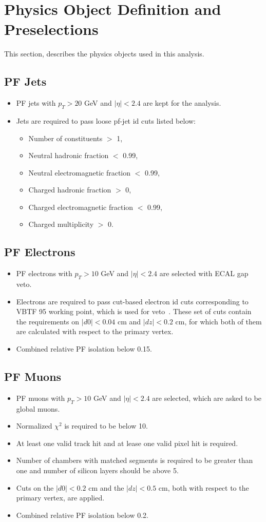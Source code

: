 \section{Physics Object Definition and Preselections}
\label{sect:objdef}
This section, describes the physics objects used in this analysis. 
\subsection{PF Jets}
\begin{itemize}
\item PF jets with $p_T>20$ GeV and $|\eta|<2.4$ are kept for the analysis.
\item Jets are required to pass loose pf-jet id cuts listed below:
\begin{itemize}
\item Number of constituents $>$ 1,
\item Neutral hadronic fraction $<$ 0.99,
\item Neutral electromagnetic fraction $<$ 0.99,
\item Charged hadronic fraction $>$ 0,
\item Charged electromagnetic fraction $<$ 0.99,
\item Charged multiplicity $>$ 0.
\end{itemize}
\end{itemize}
\subsection{PF Electrons}
\begin{itemize}
\item PF electrons with $p_T>10$ GeV and $|\eta|<2.4$ are selected with ECAL gap veto.
\item Electrons are required to pass cut-based electron id cuts corresponding to VBTF 95 working point, which is used for veto~\cite{eIDs}. These set of cuts contain the requirements on $|d0|<0.04$ cm and $|dz|<0.2$ cm, for which both of them are calculated with respect to the primary vertex. 
\item Combined relative PF isolation below 0.15.
\end{itemize}
\subsection{PF Muons}
\begin{itemize}
\item PF muons with $p_T>10$ GeV and $|\eta|<2.4$ are selected, which are asked to be global muons.
\item Normalized $\chi^2$ is required to be below 10.
\item At least one valid track hit and at lease one valid pixel hit is required.  
\item Number of chambers with matched segments is required to be greater than one and number of silicon layers should be above 5. 
\item Cuts on the $|d0|<0.2$ cm and the $|dz|<0.5$ cm, both with respect to the primary vertex, are applied.
\item Combined relative PF isolation below 0.2.
\end{itemize}


